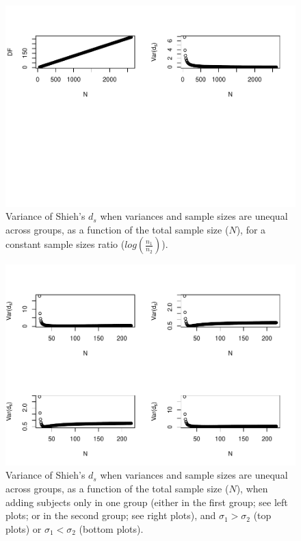 \documentclass[
  english,
  man,mask]{apa6}
\begin{document}
\begin{figure}
\centering
\includegraphics{Theoretical-Variance-of-all-estimators-as-a-function-of-population-parameters_files/figure-latex/varshiehhetunbalNsize2-1.pdf}
\caption{\label{fig:varshiehhetunbalNsize2}Variance of Shieh's \(d_s\) when variances and sample sizes are unequal across groups, as a function of the total sample size (\(N\)), for a constant sample sizes ratio (\(log\left(\frac{n_1}{n_2} \right)\)).}
\end{figure}

\begin{figure}
\centering
\includegraphics{Theoretical-Variance-of-all-estimators-as-a-function-of-population-parameters_files/figure-latex/varshiehhetunbalNsize4-1.pdf}
\caption{\label{fig:varshiehhetunbalNsize4}Variance of Shieh's \(d_s\) when variances and sample sizes are unequal across groups, as a function of the total sample size (\(N\)), when adding subjects only in one group (either in the first group; see left plots; or in the second group; see right plots), and \(\sigma_1 > \sigma_2\) (top plots) or \(\sigma_1 < \sigma_2\) (bottom plots).}
\end{figure}
\end{document}
